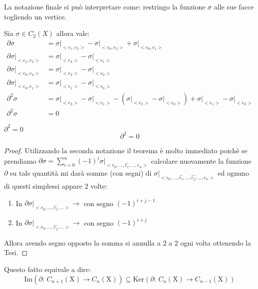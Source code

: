 \documentclass[11pt, a4paper, twoside]{article}
\begin{document}
La notazione finale si può interpretare come: restringo la funzione $\sigma$ alle sue facce togliendo un vertice.

\begin{es}
	Sia $\sigma\in C_{2}(X)$ allora vale:
	\begin{align*}
		\partial\sigma&=\sigma\vert_{<e_1,e_2>}-\sigma\vert_{<e_0,e_2>}+\sigma\vert_{<e_0,e_1>}\\
		\partial\sigma\vert_{<e_1,e_2>}&=\sigma\vert_{<e_2>}-\sigma\vert_{<e_1>}\\
		\partial\sigma\vert_{<e_0,e_2>}&=\sigma\vert_{<e_2>}-\sigma\vert_{<e_0>}\\
		\partial\sigma\vert_{<e_0,e_1>}&=\sigma\vert_{<e_1>}-\sigma\vert_{<e_0>}\\
		\partial^2\sigma&=\sigma\vert_{<e_2>}-\sigma\vert_{<e_1>}-(\sigma\vert_{<e_2>}-\sigma\vert_{<e_0>})+\sigma\vert_{<e_1>}-\sigma\vert_{<e_0>}\\
		\partial^2\sigma&=0
	\end{align*}
\end{es} 

\begin{prop}{$\partial^2=0$}{}
	\[
		\partial^2=0 
	\]
\end{prop}
\begin{proof}
	Utilizzando la seconda notazione il teorema è molto immediato poichè se prendiamo $\partial\sigma=\sum\limits_{i=0}^{n}(-1)^i\sigma\vert_{<e_0,\dots,\hat{e_i},\dots,e_n>}$ calcolare nuovamente la funzione $\partial$ su tale quantità mi darà somme (con segni) di $\sigma\vert_{<e_0,\dots,\hat{e_i},\dots,\hat{e_j},\dots,e_n>}$ ed ognuno di questi simplessi appare 2 volte:
	\begin{enumerate}
		\item  In $\partial\sigma\vert_{<e_0,\dots,\hat{e_i},\dots>}\rightarrow$ con segno $(-1)^{i+j-1}$
		\item  In $\partial\sigma\vert_{<e_0,\dots,\hat{e_j},\dots>}\rightarrow$ con segno $(-1)^{i+j}$
	\end{enumerate}
	Allora avendo segno opposto la somma si annulla a 2 a 2 ogni volta ottenendo la Tesi.
\end{proof}

\begin{oss}
	Questo fatto equivale a dire:
	\[
		\text{Im}(\partial:\,C_{n+1}(\text{X})\rightarrow C_n(\text{X}))\subseteq \text{Ker}(\partial:\, C_{n}(\text{X})\rightarrow C_{n-1}(\text{X}))
	\]
\end{oss}
\end{document}
